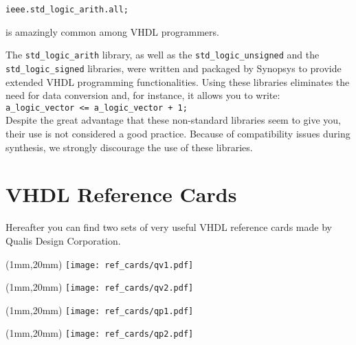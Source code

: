 \noindent
\texttt{ieee.std\_logic\_arith.all;}

\noindent
is amazingly common among VHDL programmers.

The \texttt{std\_logic\_arith} library, as well as the \texttt{std\_logic\_unsigned} and the \texttt{std\_logic\_signed} libraries, were written and packaged by Synopsys to provide extended VHDL programming functionalities. Using these libraries eliminates the need for data conversion and, for instance, it allows you to write:\\
\texttt{a\_logic\_vector <= a\_logic\_vector + 1;}\\
Despite the great advantage that these non-standard libraries seem to give you, their use is not considered a good practice. Because of compatibility issues during synthesis, we strongly discourage the use of these libraries.


\chapter{VHDL Reference Cards}
\label{ch:refcard}
Hereafter you can find two sets of very useful VHDL reference cards made by Qualis Design Corporation.

\newpage\clearpage
\thispagestyle{empty}
\begin{textblock*}{148mm}(1mm,20mm)
\texttt{[image: ref\_cards/qv1.pdf]}
\end{textblock*}
\null\newpage

\thispagestyle{empty}
\begin{textblock*}{148mm}(1mm,20mm)
\texttt{[image: ref\_cards/qv2.pdf]}
\end{textblock*}
\null\newpage

\thispagestyle{empty}
\begin{textblock*}{148mm}(1mm,20mm)
\texttt{[image: ref\_cards/qp1.pdf]}
\end{textblock*}
\null\newpage

\thispagestyle{empty}
\begin{textblock*}{148mm}(1mm,20mm)
\texttt{[image: ref\_cards/qp2.pdf]}
\end{textblock*}
\null\newpage

